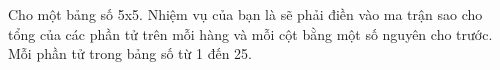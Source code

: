 Cho một bảng số 5x5. Nhiệm vụ của bạn là sẽ phải điền vào ma trận sao cho tổng của các phần tử trên mỗi hàng và mỗi cột bằng một số nguyên cho trước. Mỗi phần tử trong bảng số từ 1 đến 25.

\